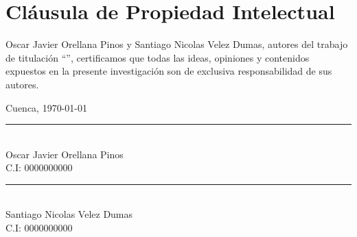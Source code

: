 \chapter*{Cláusula de Propiedad Intelectual}

Oscar Javier Orellana Pinos y Santiago Nicolas Velez Dumas, autores del trabajo de titulación “\titulotesis{}”, certificamos que todas las ideas, opiniones y contenidos expuestos en la presente investigación son de exclusiva responsabilidad de sus autores.


\vspace{3cm}

Cuenca, \today  

\vspace{3cm}

\begin{center}
    \noindent\rule{8cm}{0.4pt}\\
    Oscar Javier Orellana Pinos\\
    C.I: 0000000000  %

    \vspace{1.5cm}

    \noindent\rule{8cm}{0.4pt}\\
    Santiago Nicolas Velez Dumas\\
    C.I: 0000000000  %
\end{center}
